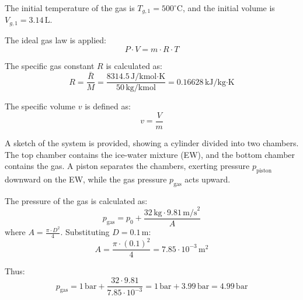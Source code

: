 The initial temperature of the gas is \( T_{g,1} = 500^\circ\text{C} \), and the initial volume is \( V_{g,1} = 3.14 \, \text{L} \).  

The ideal gas law is applied:  
\[
P \cdot V = m \cdot R \cdot T
\]  

The specific gas constant \( R \) is calculated as:  
\[
R = \frac{\bar{R}}{M} = \frac{8314.5 \, \text{J/kmol·K}}{50 \, \text{kg/kmol}} = 0.16628 \, \text{kJ/kg·K}
\]  

The specific volume \( v \) is defined as:  
\[
v = \frac{V}{m}
\]  

A sketch of the system is provided, showing a cylinder divided into two chambers. The top chamber contains the ice-water mixture (EW), and the bottom chamber contains the gas. A piston separates the chambers, exerting pressure \( p_{\text{piston}} \) downward on the EW, while the gas pressure \( p_{\text{gas}} \) acts upward.  

The pressure of the gas is calculated as:  
\[
p_{\text{gas}} = p_0 + \frac{32 \, \text{kg} \cdot 9.81 \, \text{m/s}^2}{A}
\]  
where \( A = \frac{\pi \cdot D^2}{4} \). Substituting \( D = 0.1 \, \text{m} \):  
\[
A = \frac{\pi \cdot (0.1)^2}{4} = 7.85 \cdot 10^{-3} \, \text{m}^2
\]  

Thus:  
\[
p_{\text{gas}} = 1 \, \text{bar} + \frac{32 \cdot 9.81}{7.85 \cdot 10^{-3}} = 1 \, \text{bar} + 3.99 \, \text{bar} = 4.99 \, \text{bar}
\]
